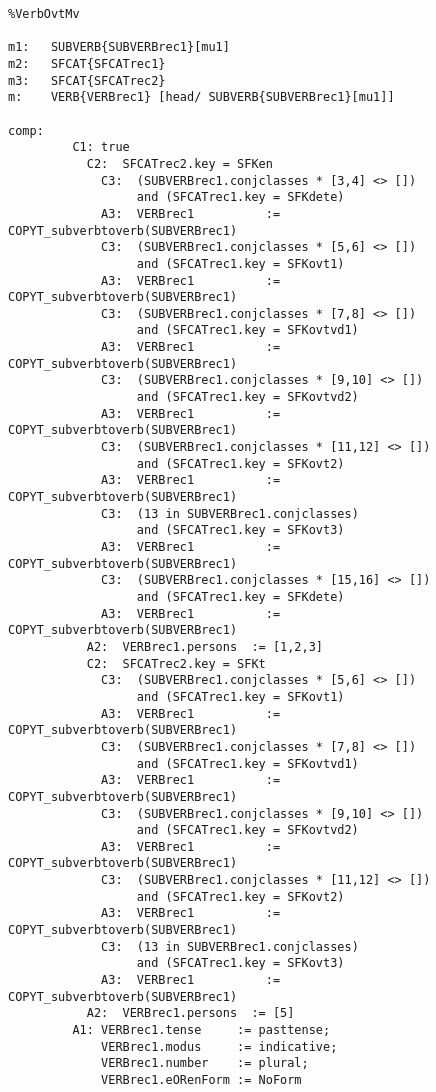 \begin{verbatim}
%VerbOvtMv 

m1:   SUBVERB{SUBVERBrec1}[mu1]
m2:   SFCAT{SFCATrec1}
m3:   SFCAT{SFCATrec2}
m:    VERB{VERBrec1} [head/ SUBVERB{SUBVERBrec1}[mu1]]

comp:
         C1: true
           C2:  SFCATrec2.key = SFKen
             C3:  (SUBVERBrec1.conjclasses * [3,4] <> []) 
                  and (SFCATrec1.key = SFKdete)
             A3:  VERBrec1          := COPYT_subverbtoverb(SUBVERBrec1)
             C3:  (SUBVERBrec1.conjclasses * [5,6] <> []) 
                  and (SFCATrec1.key = SFKovt1)
             A3:  VERBrec1          := COPYT_subverbtoverb(SUBVERBrec1)
             C3:  (SUBVERBrec1.conjclasses * [7,8] <> [])
                  and (SFCATrec1.key = SFKovtvd1)
             A3:  VERBrec1          := COPYT_subverbtoverb(SUBVERBrec1)
             C3:  (SUBVERBrec1.conjclasses * [9,10] <> []) 
                  and (SFCATrec1.key = SFKovtvd2)
             A3:  VERBrec1          := COPYT_subverbtoverb(SUBVERBrec1)
             C3:  (SUBVERBrec1.conjclasses * [11,12] <> [])
                  and (SFCATrec1.key = SFKovt2)
             A3:  VERBrec1          := COPYT_subverbtoverb(SUBVERBrec1)
             C3:  (13 in SUBVERBrec1.conjclasses) 
                  and (SFCATrec1.key = SFKovt3)
             A3:  VERBrec1          := COPYT_subverbtoverb(SUBVERBrec1)
             C3:  (SUBVERBrec1.conjclasses * [15,16] <> []) 
                  and (SFCATrec1.key = SFKdete)
             A3:  VERBrec1          := COPYT_subverbtoverb(SUBVERBrec1)
           A2:  VERBrec1.persons  := [1,2,3]
           C2:  SFCATrec2.key = SFKt
             C3:  (SUBVERBrec1.conjclasses * [5,6] <> []) 
                  and (SFCATrec1.key = SFKovt1)
             A3:  VERBrec1          := COPYT_subverbtoverb(SUBVERBrec1)
             C3:  (SUBVERBrec1.conjclasses * [7,8] <> []) 
                  and (SFCATrec1.key = SFKovtvd1)
             A3:  VERBrec1          := COPYT_subverbtoverb(SUBVERBrec1)
             C3:  (SUBVERBrec1.conjclasses * [9,10] <> [])
                  and (SFCATrec1.key = SFKovtvd2)
             A3:  VERBrec1          := COPYT_subverbtoverb(SUBVERBrec1)
             C3:  (SUBVERBrec1.conjclasses * [11,12] <> []) 
                  and (SFCATrec1.key = SFKovt2)
             A3:  VERBrec1          := COPYT_subverbtoverb(SUBVERBrec1)
             C3:  (13 in SUBVERBrec1.conjclasses) 
                  and (SFCATrec1.key = SFKovt3)
             A3:  VERBrec1          := COPYT_subverbtoverb(SUBVERBrec1)
           A2:  VERBrec1.persons  := [5]
         A1: VERBrec1.tense     := pasttense;
             VERBrec1.modus     := indicative;
             VERBrec1.number    := plural;
             VERBrec1.eORenForm := NoForm


\end{verbatim}
